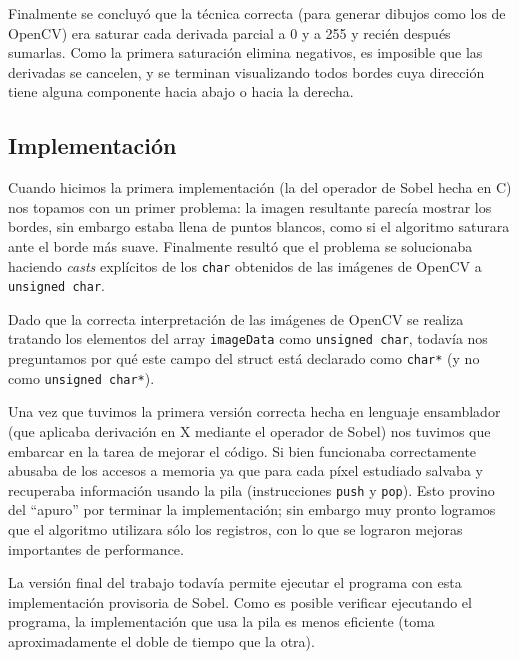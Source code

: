 Finalmente se concluyó que la técnica correcta (para generar dibujos como los de OpenCV) era saturar cada derivada parcial a 0 y a 255 y recién después sumarlas. Como la primera saturación elimina negativos, es imposible que las derivadas se cancelen, y se terminan visualizando todos bordes cuya dirección tiene alguna componente hacia abajo o hacia la derecha.


\subsection{Implementación}


Cuando hicimos la primera implementación (la del operador de Sobel hecha en C) nos topamos con un primer problema: la imagen resultante parecía mostrar los bordes, sin embargo estaba llena de puntos blancos, como si el algoritmo saturara ante el borde más suave. Finalmente resultó que el problema se solucionaba haciendo \emph{casts} explícitos de los \texttt{char} obtenidos de las imágenes de OpenCV a \texttt{unsigned char}.


Dado que la correcta interpretación de las imágenes de OpenCV se realiza tratando los elementos del array \texttt{imageData} como \texttt{unsigned char}, todavía nos preguntamos por qué este campo del struct está declarado como \texttt{char*} (y no como \texttt{unsigned char*}).


Una vez que tuvimos la primera versión correcta hecha en lenguaje ensamblador (que aplicaba derivación en X mediante el operador de Sobel) nos tuvimos que embarcar en la tarea de mejorar el código. Si bien funcionaba correctamente abusaba de los accesos a memoria ya que para cada píxel estudiado salvaba y recuperaba información usando la pila (instrucciones \texttt{push} y \texttt{pop}). Esto provino del ``apuro'' por terminar la implementación; sin embargo muy pronto logramos que el algoritmo utilizara sólo los registros, con lo que se lograron mejoras importantes de performance.

La versión final del trabajo todavía permite ejecutar el programa con esta implementación provisoria de Sobel. Como es posible verificar ejecutando el programa, la implementación que usa la pila es menos eficiente (toma aproximadamente el doble de tiempo que la otra).
